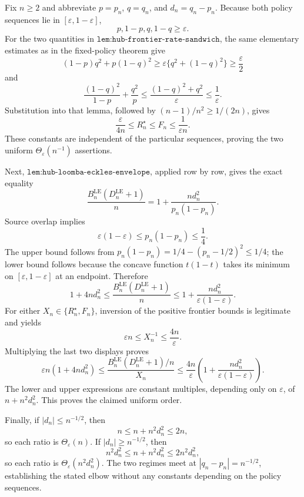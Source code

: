 Fix \(n\ge2\) and abbreviate \(p=p_n\), \(q=q_n\), and \(d_n=q_n-p_n\).  Because both policy sequences lie in \([\varepsilon,1-\varepsilon]\),
\[
 p,1-p,q,1-q\ge\varepsilon.
\]
For the two quantities in \(\texttt{lem:hub-frontier-rate-sandwich}\), the same elementary estimates as in the fixed-policy theorem give
\[
 (1-p)q^2+p(1-q)^2
 \ge\varepsilon\{q^2+(1-q)^2\}
 \ge\frac\varepsilon2
\]
and
\[
 \frac{(1-q)^2}{1-p}+\frac{q^2}{p}
 \le\frac{(1-q)^2+q^2}{\varepsilon}
 \le\frac1\varepsilon.
\]
Substitution into that lemma, followed by \((n-1)/n^2\ge1/(2n)\), gives
\[
 \frac{\varepsilon}{4n}
 \le R_n^{\star}\le F_n\le\frac1{\varepsilon n}.
\]
These constants are independent of the particular sequences, proving the two uniform \(\Theta_{\varepsilon}(n^{-1})\) assertions.

Next, \(\texttt{lem:hub-loomba-eckles-envelope}\), applied row by row, gives the exact equality
\[
 \frac{B_n^{\mathrm{LE}}(D_n^{\mathrm{LE}}+1)}n
 =1+\frac{n d_n^2}{p_n(1-p_n)}.
\]
Source overlap implies
\[
 \varepsilon(1-\varepsilon)
 \le p_n(1-p_n)\le\frac14.
\]
The upper bound follows from
\(p_n(1-p_n)=1/4-(p_n-1/2)^2\le1/4\); the lower bound follows because the concave function \(t(1-t)\) takes its minimum on \([\varepsilon,1-\varepsilon]\) at an endpoint.  Therefore
\[
 1+4n d_n^2
 \le
 \frac{B_n^{\mathrm{LE}}(D_n^{\mathrm{LE}}+1)}n
 \le
 1+\frac{n d_n^2}{\varepsilon(1-\varepsilon)}.
\]
For either \(X_n\in\{R_n^{\star},F_n\}\), inversion of the positive frontier bounds is legitimate and yields
\[
 \varepsilon n\le X_n^{-1}\le\frac{4n}{\varepsilon}.
\]
Multiplying the last two displays proves
\[
 \varepsilon n(1+4n d_n^2)
 \le
 \frac{B_n^{\mathrm{LE}}(D_n^{\mathrm{LE}}+1)/n}{X_n}
 \le
 \frac{4n}{\varepsilon}
 \left(1+\frac{n d_n^2}{\varepsilon(1-\varepsilon)}\right).
\]
The lower and upper expressions are constant multiples, depending only on \(\varepsilon\), of \(n+n^2d_n^2\).  This proves the claimed uniform order.

Finally, if \(|d_n|\le n^{-1/2}\), then
\[
 n\le n+n^2d_n^2\le2n,
\]
so each ratio is \(\Theta_{\varepsilon}(n)\).  If \(|d_n|\ge n^{-1/2}\), then
\[
 n^2d_n^2\le n+n^2d_n^2\le2n^2d_n^2,
\]
so each ratio is \(\Theta_{\varepsilon}(n^2d_n^2)\).  The two regimes meet at \(|q_n-p_n|=n^{-1/2}\), establishing the stated elbow without any constants depending on the policy sequences.